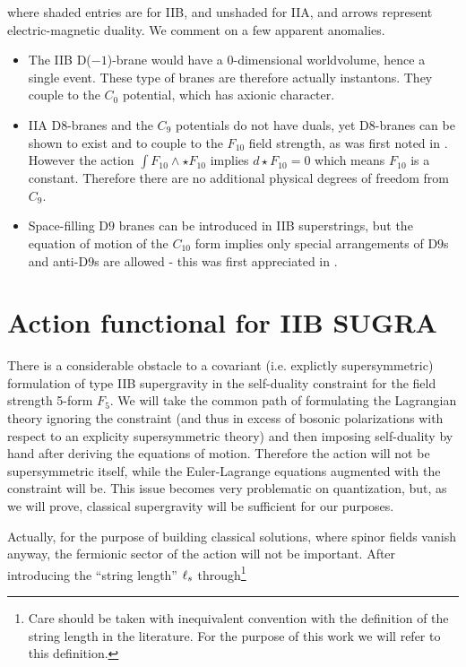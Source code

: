 where shaded entries are for IIB, and unshaded for IIA, and arrows represent electric-magnetic duality. We comment on a few apparent anomalies.

\begin{itemize}
	\item The IIB D($-1$)-brane would have a $0$-dimensional worldvolume, hence a single event. These type of branes are therefore actually instantons. They couple to the $C_0$ potential, which has axionic character.
	\item IIA D$8$-branes and the $C_9$ potentials do not have duals, yet D$8$-branes can be shown to exist and to couple to the $F_{10}$ field strength, as was first noted in \cite{pcA9}. However the action $\int F_{10} \wedge \star F_{10}$ implies $d\star F_{10} = 0$ which means $F_{10}$ is a constant. Therefore there are no additional physical degrees of freedom from $C_9$.
	\item Space-filling D$9$ branes can be introduced in IIB superstrings, but the equation of motion of the $C_{10}$ form implies only special arrangements of D$9$s and anti-D$9$s are allowed - this was first appreciated in \cite{pcA10}.
\end{itemize}


\section{Action functional for IIB SUGRA}\label{sec:sugra}

There is a considerable obstacle to a covariant (i.e. explictly supersymmetric) formulation of type IIB supergravity in the self-duality constraint for the field strength 5-form $F_5$. We will take the common path of formulating the Lagrangian theory ignoring the constraint (and thus in excess of bosonic polarizations with respect to an explicity supersymmetric theory) and then imposing self-duality by hand after deriving the equations of motion. Therefore the action will not be supersymmetric itself, while the Euler-Lagrange equations augmented with the constraint will be. This issue becomes very problematic on quantization, but, as we will prove, classical supergravity will be sufficient for our purposes.

Actually, for the purpose of building classical solutions, where spinor fields vanish anyway, the fermionic sector of the action will not be important. After introducing the ``string length'' $\ell_s$ through\footnote{Care should be taken with inequivalent convention with the definition of the string length in the literature. For the purpose of this work we will refer to this definition.} 

